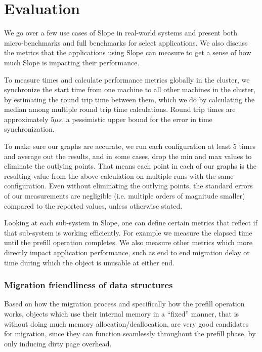 \chapter{Evaluation}
\label{chap:evaluation}

We go over a few use cases of Slope in real-world systems and present both
micro-benchmarks and full benchmarks for select applications. We also discuss
the metrics that the applications using Slope can measure to get a sense of
how much Slope is impacting their performance.

To measure times and calculate performance metrics globally in the cluster,
we synchronize the start time from one machine to all other machines in the
cluster, by estimating the round trip time between them, which we do by
calculating the median among multiple round trip time calculations. Round
trip times are approximately $5 {\mu}{s}$, a pessimistic upper bound for the
error in time synchronization.

To make sure our graphs are accurate, we run each configuration at least 5 times
and average out the results, and in some cases, drop the min and max values to
eliminate the outlying points. That means each point in each of our graphs is
the resulting value from the above calculation on multiple runs with the same
configuration. Even without eliminating the outlying points, the standard errors
of our measurements are negligible (i.e. multiple orders of magnitude smaller)
compared to the reported values, unless otherwise stated.

Looking at each sub-system in Slope, one can define certain metrics that
reflect if that sub-system is working efficiently. For example we measure
the elapsed time until the prefill operation completes. We also measure
other metrics which more directly impact application performance, such as
end to end migration delay or time during which the object is unusable at
either end.

\subsection{Migration friendliness of data structures}
Based on how the migration process and specifically how the prefill operation
works, objects which use their internal memory in a ``fixed'' manner, that is
without doing much memory allocation/deallocation, are very good candidates
for migration, since they can function seamlessly throughout the prefill phase,
by only inducing dirty page overhead.

